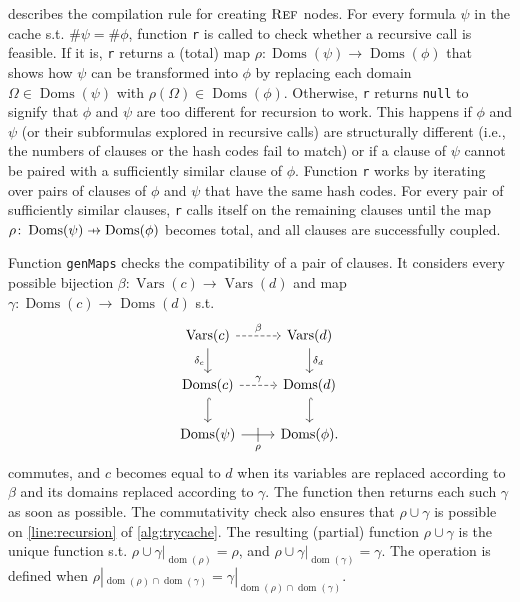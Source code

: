 \documentclass{article}
\theoremstyle{definition}
\newcommand\pfun{\mathrel{\ooalign{\hfil$\mapstochar\mkern5mu$\hfil\cr$\to$\cr}}}
\DeclareMathOperator{\Reff}{\textsc{Ref}}
\DeclareMathOperator{\dom}{dom}
\DeclareMathOperator{\Doms}{Doms}
\DeclareMathOperator{\Vars}{Vars}
\begin{document}
 describes the compilation rule for creating $\Reff$ nodes.
For every formula $\psi$ in the cache s.t. $\#\psi = \#\phi$, function
\texttt{r} is called to check whether a recursive call is feasible. If it is,
\texttt{r} returns a (total) map $\rho\colon \Doms(\psi) \to \Doms(\phi)$ that
shows how $\psi$ can be transformed into $\phi$ by replacing each domain
$\Omega \in \Doms(\psi)$ with $\rho(\Omega) \in \Doms(\phi)$. Otherwise,
\texttt{r} returns \texttt{null} to signify that $\phi$ and $\psi$ are too
different for recursion to work. This happens if $\phi$ and $\psi$ (or their
subformulas explored in recursive calls) are structurally different (i.e., the
numbers of clauses or the hash codes fail to match) or if a clause of $\psi$
cannot be paired with a sufficiently similar clause of $\phi$. Function
\texttt{r} works by iterating over pairs of clauses of $\phi$ and $\psi$ that
have the same hash codes. For every pair of sufficiently similar clauses,
\texttt{r} calls itself on the remaining clauses until the map
$\rho\colon \Doms(\psi) \pfun \Doms(\phi)$ becomes total, and all clauses are
successfully coupled.

Function \texttt{genMaps} checks the compatibility of a pair of clauses. It
considers every possible bijection $\beta\colon \Vars(c) \to \Vars(d)$ and map
$\gamma\colon \Doms(c) \to \Doms(d)$ s.t.
\[
  \begin{tikzcd}
    \Vars(c) \ar[r, dashed, "\beta"] \arrow[d, swap, "\delta_c"] & \Vars(d) \ar[d, "\delta_d"] \\
    \Doms(c) \ar[r, dashed, "\gamma"] \ar[d, hookrightarrow] & \Doms(d) \ar[d, hookrightarrow] \\
    \Doms(\psi) \ar[r, swap, "\rho", "|" marking, outer sep=5pt] & \Doms(\phi).
  \end{tikzcd}
\]
commutes, and $c$ becomes equal to $d$ when its variables are replaced according
to $\beta$ and its domains replaced according to $\gamma$. The function then
returns each such $\gamma$ as soon as possible. The commutativity check also
ensures that $\rho \cup \gamma$ is possible on \cref{line:recursion} of
\cref{alg:trycache}. The resulting (partial) function $\rho \cup \gamma$ is the
unique function s.t. $\rho \cup \gamma|_{\dom(\rho)} = \rho$, and
$\rho \cup \gamma|_{\dom(\gamma)} = \gamma$. The operation is defined when
$\rho|_{\dom(\rho)\cap\dom(\gamma)} = \gamma|_{\dom(\rho)\cap\dom(\gamma)}$.
\end{document}
